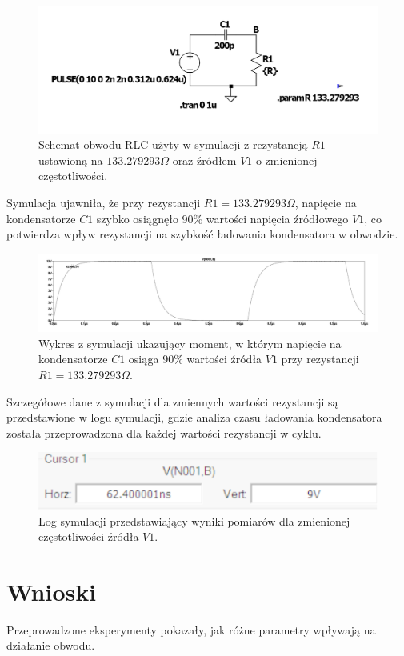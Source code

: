 \documentclass[10pt]{article}
\begin{document}
	\begin{figure}[H]
		\centering
		\includegraphics[width=0.8\linewidth]{3dobwod}
		\caption{Schemat obwodu RLC użyty w symulacji z rezystancją $R1$ ustawioną na $133.279293 \Omega$ oraz źródłem $V1$ o zmienionej częstotliwości.}
		\label{fig:3dobwod}
	\end{figure}
	
	Symulacja ujawniła, że przy rezystancji $R1 = 133.279293 \Omega$, napięcie na kondensatorze $C1$ szybko osiągnęło 90\% wartości napięcia źródłowego $V1$, co potwierdza wpływ rezystancji na szybkość ładowania kondensatora w obwodzie.
	
	\begin{figure}[H]
		\centering
		\includegraphics[width=\linewidth]{3dwykres}
		\caption{Wykres z symulacji ukazujący moment, w którym napięcie na kondensatorze $C1$ osiąga 90\% wartości źródła $V1$ przy rezystancji $R1 = 133.279293 \Omega$.}
		\label{fig:3dwykres}
	\end{figure}
	
	Szczegółowe dane z symulacji dla zmiennych wartości rezystancji są przedstawione w logu symulacji, gdzie analiza czasu ładowania kondensatora została przeprowadzona dla każdej wartości rezystancji w cyklu.
	
	\begin{figure}[H]
		\centering
		\includegraphics[width=\linewidth]{3dlog}
		\caption{Log symulacji przedstawiający wyniki pomiarów dla zmienionej częstotliwości źródła $V1$.}
		\label{fig:3dlog}
	\end{figure}
	
	\section*{Wnioski}
	Przeprowadzone eksperymenty pokazały, jak różne parametry wpływają na działanie obwodu. 
	
	
	
\end{document}
